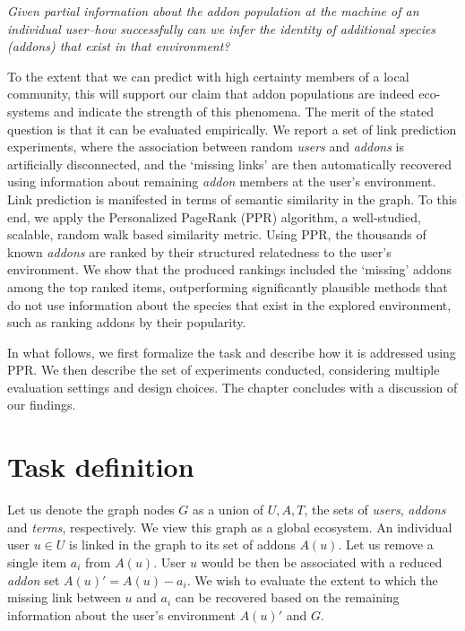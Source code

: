 \documentclass[11pt,oneside]{book}
\let\Oldsection\section
\renewcommand{\section}{\FloatBarrier\Oldsection}
\begin{document}
{\it Given partial information about the addon population at the machine of an individual user--how successfully can we infer the identity of additional species (addons) that exist in that environment?}

To the extent that we can predict with high certainty members of a local community, this will support our claim that addon populations are indeed eco-systems and indicate the strength of this phenomena. The merit of the stated
question is that it can be evaluated empirically. We report a
set of link prediction experiments, where the association between random {\it users} and {\it addons} is artificially disconnected, and the `missing links' are then automatically recovered using information about remaining {\it addon} members at the user's environment. Link prediction is manifested in terms of semantic similarity in the graph. To this end, we apply the Personalized
PageRank (PPR) algorithm, a well-studied, scalable, random walk based similarity metric. Using PPR, the thousands of known {\it addons} are ranked by their structured relatedness to the user's environment. We show that the produced rankings included the `missing' addons among the top ranked items, outperforming significantly plausible methods that do not use information about the species that exist in the explored environment, such as ranking addons by their popularity. 

In what follows, we first formalize the task and describe how it is addressed using PPR. We then describe the set of experiments conducted, considering multiple evaluation settings and design choices. The chapter concludes with a discussion of our findings.

\section{Task definition}
\label{sec:task}

Let us denote the graph nodes $G$ as a union of $U,A,T$, the sets of
{\it users}, {\it addons} and {\it terms}, respectively. We view this
graph as a global ecosystem. An individual user $u\in U$ is linked in
the graph to its set of addons $A(u)$. Let us remove a single item $a_i$
from $A(u)$. User $u$ would be then be associated with a reduced {\it
  addon} set $A(u)'=A(u)-a_i$. We wish to evaluate the extent to which the missing link between $u$ and $a_i$ can be recovered based on the remaining information about the user's environment $A(u)'$ and $G$.
\end{document}
